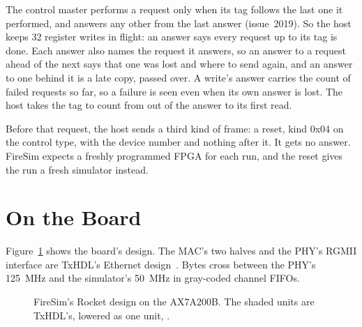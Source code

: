 \documentclass[journal,9pt]{IEEEtran}
\begin{document}
The control master performs a request only when its tag follows the
last one it performed, and answers any other from the last answer
(issue~2019). So the host keeps 32 register writes in flight: an
answer says every request up to its tag is done. Each answer also
names the request it answers, so an answer to a request ahead of the
next says that one was lost and where to send again, and an answer to
one behind it is a late copy, passed over. A
write's answer carries the count of failed requests so far, so a
failure is seen even when its own answer is lost. The host takes the
tag to count from out of the answer to its first read.

Before that request, the host sends a third kind of frame: a reset, kind
0x04 on the control type, with the device number and nothing after it.
It gets no answer. FireSim expects a freshly programmed FPGA for each
run, and the reset gives the run a fresh simulator instead.

\section{On the Board}
\label{sec:f-board}

Figure~\ref{fig:f-board} shows the board's design. The MAC's two halves
and the PHY's RGMII interface are TxHDL's Ethernet design~\cite{eth}.
Bytes cross between the PHY's 125~MHz and the simulator's 50~MHz in
gray-coded channel FIFOs.

\begin{figure}[htbp]
\centering
{}
\caption{FireSim's Rocket design on the AX7A200B. The shaded units are
TxHDL's, lowered as one unit, .}
\label{fig:f-board}
\end{figure}
\end{document}
